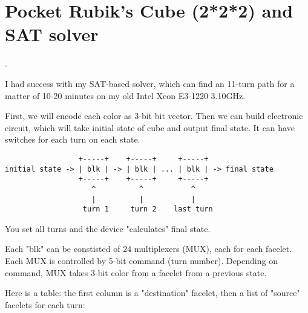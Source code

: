 \section{Pocket Rubik's Cube (2*2*2) and SAT solver}
\label{PocketCubeSAT}.

\renewcommand{\CURPATH}{puzzles/rubik2/SAT}

I had success with my SAT-based solver, which can find an 11-turn path for a matter of 10-20 minutes on my old
Intel Xeon E3-1220 3.10GHz.

First, we will encode each color as 3-bit bit vector.
Then we can build electronic circuit, which will take initial state of cube and output final state.
It can have switches for each turn on each state.

\begin{lstlisting}
                 +-----+    +-----+     +-----+
initial state -> | blk | -> | blk | ... | blk | -> final state
                 +-----+    +-----+     +-----+
                    ^          ^           ^
                    |          |           |
                  turn 1     turn 2    last turn
\end{lstlisting}

You set all turns and the device "calculates" final state.

Each "blk" can be constisted of 24 multiplexers (MUX), each for each facelet.
Each MUX is controlled by 5-bit command (turn number).
Depending on command, MUX takes 3-bit color from a facelet from a previous state.

Here is a table: the first column is a "destination" facelet, then a list of "source" facelets for each turn:

